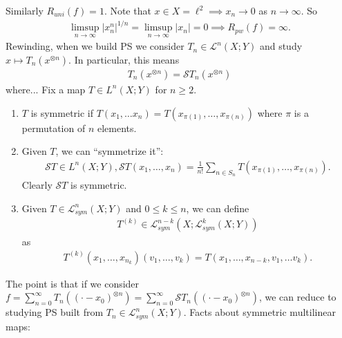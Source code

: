 \documentclass{report}
\begin{document}
Similarly $R_{uni}(f) = 1$. Note that $x \in X = \ell^2 \implies x_n \to 0$ as $n \to \infty$. So
\begin{align*}
    \limsup_{n \to \infty} |x_n^n|^{1/n} = \limsup_{n \to \infty} |x_n| = 0 \implies R_{pw}(f) = \infty.
\end{align*}
Rewinding, when we build PS we consider $T_n \in \mathcal L^n(X; Y)$ and study $x \mapsto T_n(x^{\otimes n})$. In particular, this means 
\begin{align*}
    T_n(x^{\otimes n}) = \mathcal S T_n(x^{\otimes n})
\end{align*}
where... Fix a map $T \in L^n(X; Y)$ for $n \geq 2$. 
\begin{enumerate}
    \item $T$ is symmetric if $T(x_1, \ldots x_n) = T(x_{\pi(1)}, \ldots, x_{\pi(n)})$ where $\pi$ is a permutation of $n$ elements.
    \item Given $T$, we can ``symmetrize it'': 
    \begin{align*}
        \mathcal ST \in L^n(X; Y), \mathcal ST(x_1, \ldots, x_n) = \frac{1}{n!} \sum_{n \in S_n} T(x_{\pi(1)}, \ldots, x_{\pi(n)}).
    \end{align*}
    Clearly $\mathcal ST$ is symmetric.
    \item Given $T \in \mathcal L_{sym}^n(X; Y)$ and $0 \leq k \leq n$, we can define 
    \begin{align*}
        T^{(k)} \in \mathcal L_{sym}^{n-k}(X; \mathcal L^k_{sym}(X; Y))
    \end{align*}
    as 
    \begin{align*}
        T^{(k)}(x_1, \ldots, x_{n_k})(v_1, \ldots, v_k) = T(x_1, \ldots, x_{n-k}, v_1, \ldots v_k).
    \end{align*}
\end{enumerate}
The point is that if we consider $f = \sum_{n=0}^\infty T_n((\cdot - x_0)^{\otimes n}) = \sum_{n=0}^\infty \mathcal ST_n((\cdot - x_0)^{\otimes n})$, we can reduce to studying PS built from $T_n \in \mathcal L^n_{sym}(X; Y)$.
\newpage
\noindent Facts about symmetric multilinear maps:
\end{document}
